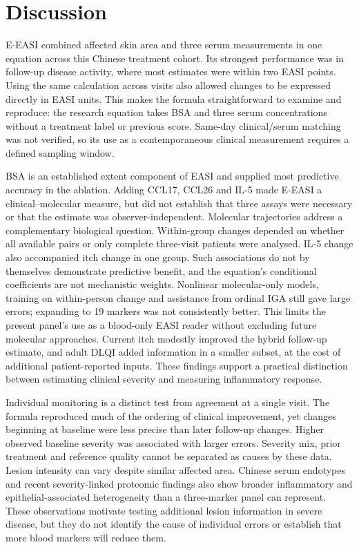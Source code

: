 \section{Discussion}
E-EASI combined affected skin area and three serum measurements in one equation across this Chinese treatment cohort. Its strongest performance was in follow-up disease activity, where most estimates were within two EASI points. Using the same calculation across visits also allowed changes to be expressed directly in EASI units. This makes the formula straightforward to examine and reproduce: the research equation takes BSA and three serum concentrations without a treatment label or previous score. Same-day clinical/serum matching was not verified, so its use as a contemporaneous clinical measurement requires a defined sampling window.

BSA is an established extent component of EASI and supplied most predictive accuracy in the ablation.\citep{hanifin2022,home_easi} Adding CCL17, CCL26 and IL-5 made E-EASI a clinical--molecular measure, but did not establish that three assays were necessary or that the estimate was observer-independent. Molecular trajectories address a complementary biological question. Within-group changes depended on whether all available pairs or only complete three-visit patients were analysed. IL-5 change also accompanied itch change in one group. Such associations do not by themselves demonstrate predictive benefit, and the equation's conditional coefficients are not mechanistic weights. Nonlinear molecular-only models, training on within-person change and assistance from ordinal IGA still gave large errors; expanding to 19 markers was not consistently better. This limits the present panel's use as a blood-only EASI reader without excluding future molecular approaches. Current itch modestly improved the hybrid follow-up estimate, and adult DLQI added information in a smaller subset, at the cost of additional patient-reported inputs. These findings support a practical distinction between estimating clinical severity and measuring inflammatory response.

Individual monitoring is a distinct test from agreement at a single visit. The formula reproduced much of the ordering of clinical improvement, yet changes beginning at baseline were less precise than later follow-up changes. Higher observed baseline severity was associated with larger errors. Severity mix, prior treatment and reference quality cannot be separated as causes by these data. Lesion intensity can vary despite similar affected area. Chinese serum endotypes and recent severity-linked proteomic findings also show broader inflammatory and epithelial-associated heterogeneity than a three-marker panel can represent.\citep{wu2023,lally2026} These observations motivate testing additional lesion information in severe disease, but they do not identify the cause of individual errors or establish that more blood markers will reduce them.


